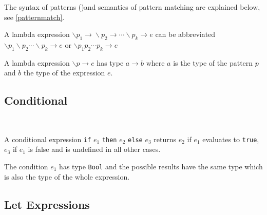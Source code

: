 \begin{flushleft}
 \sym{$\backslash$}  
  \alt \sym{$\backslash$}  \sym{->} 
\end{flushleft}

The syntax of patterns ()and semantics of pattern matching are explained below, see \autoref{patternmatch}.

A lambda expression $\backslash{}p_1\rightarrow{}\backslash{}p_2 \rightarrow{}\cdots{}\backslash{}p_k \rightarrow{} e$ can be abbreviated\\ $\backslash{}p_1 \backslash{}p_2 \cdots{} \backslash{}p_k \rightarrow{} e$ or $\backslash{}p_1 p_2 \cdots{} p_k \rightarrow{} e$ 

A lambda expression $\backslash{}p \rightarrow{} e$ has type $a \rightarrow{} b$ where $a$ is the type of the pattern $p$ and $b$ the type of the expression $e$.



\subsection{Conditional} \label{conditional} 

\begin{flushleft}
      \\
\end{flushleft}

A conditional expression \texttt{if} $e_1$ \texttt{then} $e_2$ \texttt{else} $e_3$ returns $e_2$ if $e_1$ evaluates to \texttt{true}, $e_3$ if $e_1$ is false and is undefined in all other cases.

The condition $e_1$ has type \texttt{Bool} and the possible results have the same type which is also the type of the whole expression.

\subsection{Let Expressions}  \label{letexpr}

